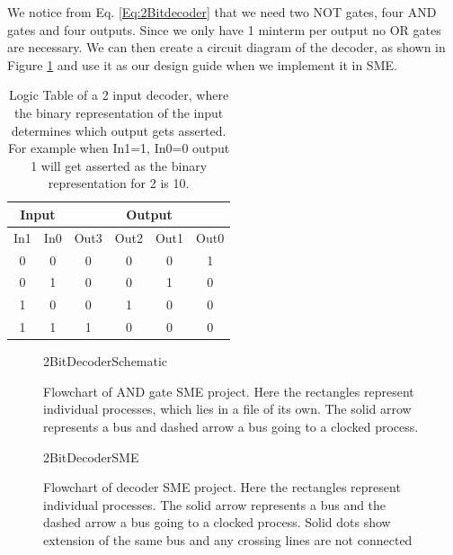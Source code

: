         We notice from Eq. \ref{Eq:2Bitdecoder} that we need two NOT gates, four AND gates and four outputs. Since we only have 1 minterm per output no OR gates are necessary.
        We can then create a circuit diagram of the decoder, as shown in Figure \ref{fig:2BitDecoderSchematic} and use it as our design guide when we implement it in SME.
         
        
        \begin{table}[h!]
            \centering
            \begin{tabular}{|c|c||c|c|c|c|}
                \hline
                \multicolumn{2}{|c||}{\textbf{Input}}& \multicolumn{4}{c|}{\textbf{Output}}                  \\ \hline
                In1        & In0        & Out3 & Out2 & Out1 & Out0 \\ \hline
                0          & 0          & 0    & 0    & 0    & 1    \\ \hline
                0          & 1          & 0    & 0    & 1    & 0    \\ \hline
                1          & 0          & 0    & 1    & 0    & 0    \\ \hline
                1          & 1          & 1    & 0    & 0    & 0    \\ \hline
            \end{tabular}
            \caption{Logic Table of a 2 input decoder, where the binary representation of the input determines which output gets asserted. For example when In1=1, In0=0 output 1 will get asserted as the binary representation for 2 is 10.}
            \label{LogicTable:2BitDecoder}
        \end{table}
    
        \begin{figure}[h!]
            \centering
            {2BitDecoderSchematic}
            \caption{Flowchart of AND gate SME project. Here the rectangles represent individual processes, which lies in a file of its own. The solid arrow represents a bus and dashed arrow a bus going to a clocked process.}
            \label{fig:2BitDecoderSchematic}
        \end{figure}
    
        \begin{figure}[h!]
            \centering
            {2BitDecoderSME}
            \caption{Flowchart of decoder SME project. Here the rectangles represent individual processes. The solid arrow represents a bus and the dashed arrow a bus going to a clocked process. Solid dots show extension of the same bus and any crossing lines are not connected}
            \label{fig:2BitDecoderSME}
        \end{figure}    
        



    
    
